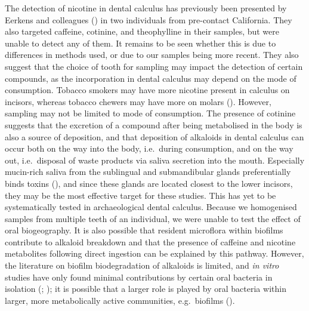 \documentclass[
  b5paper,
]{book}
\begin{document}
The detection of nicotine in dental calculus has previously been
presented by Eerkens and colleagues
() in two individuals from
pre-contact California. They also targeted caffeine, cotinine, and
theophylline in their samples, but were unable to detect any of them. It
remains to be seen whether this is due to differences in methods used,
or due to our samples being more recent. They also suggest that the
choice of tooth for sampling may impact the detection of certain
compounds, as the incorporation in dental calculus may depend on the
mode of consumption. Tobacco smokers may have more nicotine present in
calculus on incisors, whereas tobacco chewers may have more on molars
().
However, sampling may not be limited to mode of consumption. The
presence of cotinine suggests that the excretion of a compound after
being metabolised in the body is also a source of deposition, and that
deposition of alkaloids in dental calculus can occur both on the way
into the body, i.e.~during consumption, and on the way out,
i.e.~disposal of waste products via saliva secretion into the mouth.
Especially mucin-rich saliva from the sublingual and submandibular
glands preferentially binds toxins
(), and since
these glands are located closest to the lower incisors, they may be the
most effective target for these studies. This has yet to be
systematically tested in archaeological dental calculus. Because we
homogenised samples from multiple teeth of an individual, we were unable
to test the effect of oral biogeography. It is also possible that
resident microflora within biofilms contribute to alkaloid breakdown and
that the presence of caffeine and nicotine metabolites following direct
ingestion can be explained by this pathway. However, the literature on
biofilm biodegradation of alkaloids is limited, and \emph{in vitro}
studies have only found minimal contributions by certain oral bacteria
in isolation (;
); it is
possible that a larger role is played by oral bacteria within larger,
more metabolically active communities, e.g.~biofilms
().
\end{document}
